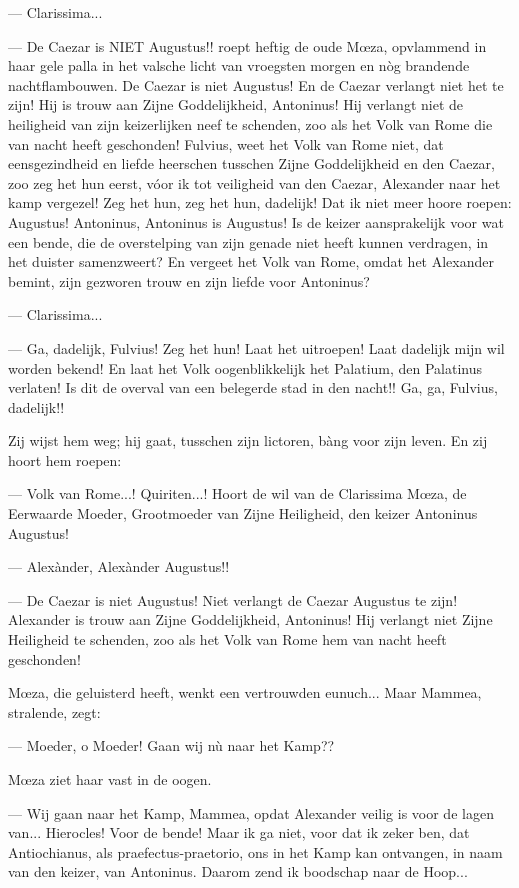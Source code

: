 \documentclass[a4paper, 12pt, oneside, dutch]{article}
\begin{document}
--- Clarissima...

--- De Caezar is NIET Augustus!! roept heftig de oude Mœza, opvlammend in haar gele palla in het valsche licht van vroegsten morgen en nòg brandende nachtflambouwen. De Caezar is niet Augustus! En de Caezar verlangt niet het te zijn! Hij is trouw aan Zijne Goddelijkheid, Antoninus! Hij verlangt niet de heiligheid van zijn keizerlijken neef te schenden, zoo als het Volk van Rome die van nacht heeft geschonden! Fulvius, weet het Volk van Rome niet, dat eensgezindheid en liefde heerschen tusschen Zijne Goddelijkheid en den Caezar, zoo zeg het hun eerst, vóor ik tot veiligheid van den Caezar, Alexander naar het kamp vergezel! Zeg het hun, zeg het hun, dadelijk! Dat ik niet meer hoore roepen: Augustus! Antoninus, Antoninus is Augustus! Is de keizer aansprakelijk voor wat een bende, die de overstelping van zijn genade niet heeft kunnen verdragen, in het duister samenzweert? En vergeet het Volk van Rome, omdat het Alexander bemint, zijn gezworen trouw en zijn liefde voor Antoninus?

--- Clarissima...

--- Ga, dadelijk, Fulvius! Zeg het hun! Laat het uitroepen! Laat dadelijk mijn wil worden bekend! En laat het Volk oogenblikkelijk het Palatium, den Palatinus verlaten! Is dit de overval van een belegerde stad in den nacht!! Ga, ga, Fulvius, dadelijk!!

Zij wijst hem weg; hij gaat, tusschen zijn lictoren, bàng voor zijn leven. En zij hoort hem roepen:

--- Volk van Rome...! Quiriten...! Hoort de wil van de Clarissima Mœza, de Eerwaarde Moeder, Grootmoeder van Zijne Heiligheid, den keizer Antoninus Augustus!

--- Alexànder, Alexànder Augustus!!

--- De Caezar is niet Augustus! Niet verlangt de Caezar Augustus te zijn! Alexander is trouw aan Zijne Goddelijkheid, Antoninus! Hij verlangt niet Zijne Heiligheid te schenden, zoo als het Volk van Rome hem van nacht heeft geschonden!

Mœza, die geluisterd heeft, wenkt een vertrouwden eunuch... Maar Mammea, stralende, zegt:

--- Moeder, o Moeder! Gaan wij nù naar het Kamp??

Mœza ziet haar vast in de oogen.

--- Wij gaan naar het Kamp, Mammea, opdat Alexander veilig is voor de lagen van... Hierocles! Voor de bende! Maar ik ga niet, voor dat ik zeker ben, dat Antiochianus, als praefectus-praetorio, ons in het Kamp kan ontvangen, in naam van den keizer, van Antoninus. Daarom zend ik boodschap naar de Hoop...
\end{document}
